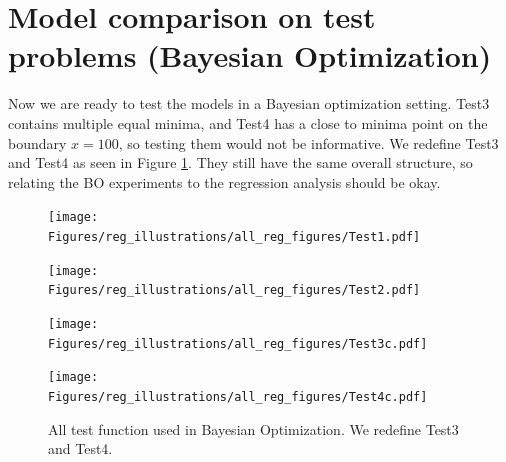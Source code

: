 \section{Model comparison on test problems (Bayesian Optimization)}
Now we are ready to test the models in a Bayesian optimization setting. Test3 contains multiple
equal minima, and Test4 has a close to minima point on the boundary $x=100$, so testing them would
not be informative. We redefine Test3 and Test4 as seen in Figure \ref{TEST_problems2}. They still
have the same overall structure, so relating the BO experiments to the regression analysis
should be okay. 

\begin{figure}[H]
  \centering
  \begin{minipage}[b]{0.24\textwidth}
   \texttt{[image: Figures/reg\_illustrations/all\_reg\_figures/Test1.pdf]}
  \end{minipage}
  \hfill
  \begin{minipage}[b]{0.24\textwidth}
    \texttt{[image: Figures/reg\_illustrations/all\_reg\_figures/Test2.pdf]}
   \end{minipage}
   \hfill
   \begin{minipage}[b]{0.24\textwidth}
    \texttt{[image: Figures/reg\_illustrations/all\_reg\_figures/Test3c.pdf]}
   \end{minipage}
   \hfill
   \begin{minipage}[b]{0.24\textwidth}
     \texttt{[image: Figures/reg\_illustrations/all\_reg\_figures/Test4c.pdf]}
    \end{minipage}
  \caption{All test function used in Bayesian Optimization. We redefine Test3 and Test4.}
  \label{TEST_problems2}
\end{figure}

